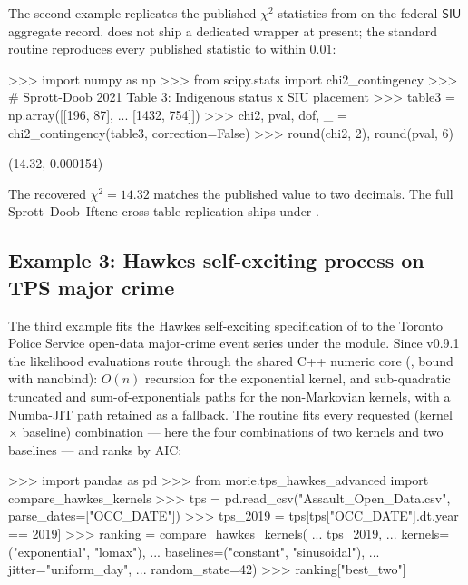 \documentclass[article,shortnames,nojss]{jss}
\newcommand{\SIU}{\textsf{SIU}}
\begin{document}
The second example replicates the published $\chi^{2}$ statistics
from \citet{SprottDoob2021} on the federal $\SIU$ aggregate
record.   does not ship a dedicated
 wrapper at present; the standard
 routine reproduces every
published statistic to within $0.01$:

\begin{Code}
>>> import numpy as np
>>> from scipy.stats import chi2_contingency
>>> # Sprott-Doob 2021 Table 3: Indigenous status x SIU placement
>>> table3 = np.array([[196,  87],
...                    [1432, 754]])
>>> chi2, pval, dof, _ = chi2_contingency(table3, correction=False)
>>> round(chi2, 2), round(pval, 6)
\end{Code}

\begin{Code}
(14.32, 0.000154)
\end{Code}

The recovered $\chi^{2} = 14.32$ matches the published value to
two decimals.  The full Sprott--Doob--Iftene cross-table replication
ships under .

\subsection{Example 3: Hawkes self-exciting process on TPS major crime}

The third example fits the Hawkes self-exciting specification of
\citet{Ruhela2026Hawkes} to the Toronto Police Service open-data
major-crime event series under the 
module. Since v0.9.1 the likelihood evaluations route through the
shared C++ numeric core (, bound with nanobind):
$O(n)$ recursion for the exponential kernel, and sub-quadratic
truncated and sum-of-exponentials paths for the non-Markovian
kernels, with a Numba-JIT path retained as a fallback. The
 routine fits every requested
(kernel $\times$ baseline) combination --- here the four
combinations of two kernels and two baselines --- and ranks by AIC:

\begin{Code}
>>> import pandas as pd
>>> from morie.tps_hawkes_advanced import compare_hawkes_kernels
>>> tps = pd.read_csv("Assault_Open_Data.csv", parse_dates=["OCC_DATE"])
>>> tps_2019 = tps[tps["OCC_DATE"].dt.year == 2019]
>>> ranking = compare_hawkes_kernels(
...     tps_2019,
...     kernels=("exponential", "lomax"),
...     baselines=("constant", "sinusoidal"),
...     jitter="uniform_day",
...     random_state=42)
>>> ranking["best_two"]
\end{Code}
\end{document}
